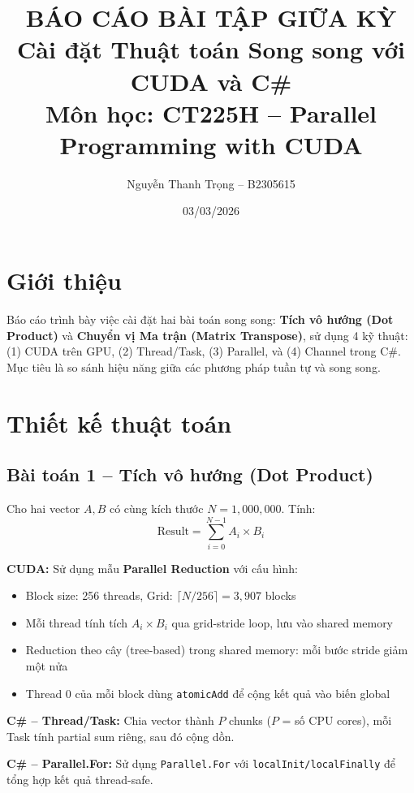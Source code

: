 \documentclass[12pt,a4paper]{article}
\title{
    \textbf{BÁO CÁO BÀI TẬP GIỮA KỲ} \\[0.3cm]
    \large Cài đặt Thuật toán Song song với CUDA và C\# \\[0.5cm]
    \normalsize Môn học: CT225H -- Parallel Programming with CUDA
}
\author{Nguyễn Thanh Trọng -- B2305615}
\date{03/03/2026}
\begin{document}
\maketitle

\section{Giới thiệu}
Báo cáo trình bày việc cài đặt hai bài toán song song: \textbf{Tích vô hướng (Dot Product)} và \textbf{Chuyển vị Ma trận (Matrix Transpose)}, sử dụng 4 kỹ thuật: (1) CUDA trên GPU, (2) Thread/Task, (3) Parallel, và (4) Channel trong C\#. Mục tiêu là so sánh hiệu năng giữa các phương pháp tuần tự và song song.

\section{Thiết kế thuật toán}

\subsection{Bài toán 1 -- Tích vô hướng (Dot Product)}

Cho hai vector $A, B$ có cùng kích thước $N = 1{,}000{,}000$. Tính:
$$\text{Result} = \sum_{i=0}^{N-1} A_i \times B_i$$

\textbf{CUDA:} Sử dụng mẫu \textbf{Parallel Reduction} với cấu hình:
\begin{itemize}[nosep]
    \item Block size: 256 threads, Grid: $\lceil N/256 \rceil = 3{,}907$ blocks
    \item Mỗi thread tính tích $A_i \times B_i$ qua grid-stride loop, lưu vào shared memory
    \item Reduction theo cây (tree-based) trong shared memory: mỗi bước stride giảm một nửa
    \item Thread 0 của mỗi block dùng \texttt{atomicAdd} để cộng kết quả vào biến global
\end{itemize}

\textbf{C\# -- Thread/Task:} Chia vector thành $P$ chunks ($P$ = số CPU cores), mỗi Task tính partial sum riêng, sau đó cộng dồn.

\textbf{C\# -- Parallel.For:} Sử dụng \texttt{Parallel.For} với \texttt{localInit/localFinally} để tổng hợp kết quả thread-safe.
\end{document}
